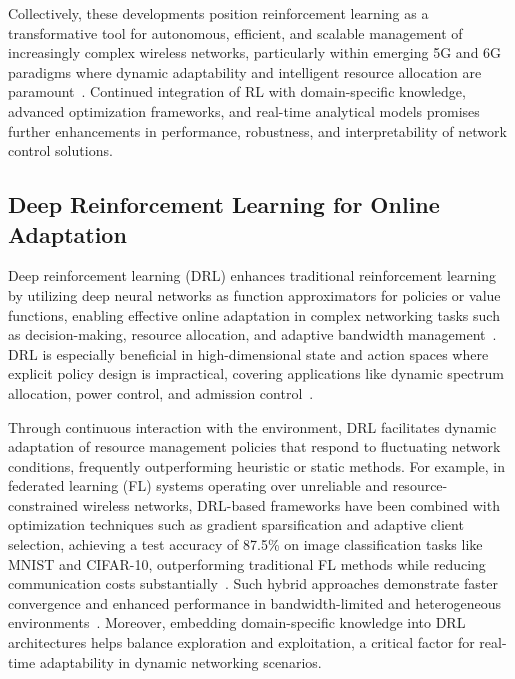 \documentclass[sigconf]{acmart}
\begin{document}
Collectively, these developments position reinforcement learning as a transformative tool for autonomous, efficient, and scalable management of increasingly complex wireless networks, particularly within emerging 5G and 6G paradigms where dynamic adaptability and intelligent resource allocation are paramount~\cite{ref7,ref50}. Continued integration of RL with domain-specific knowledge, advanced optimization frameworks, and real-time analytical models promises further enhancements in performance, robustness, and interpretability of network control solutions.

\subsection{Deep Reinforcement Learning for Online Adaptation}

Deep reinforcement learning (DRL) enhances traditional reinforcement learning by utilizing deep neural networks as function approximators for policies or value functions, enabling effective online adaptation in complex networking tasks such as decision-making, resource allocation, and adaptive bandwidth management~\cite{ref4,ref8,ref13,ref15,ref50}. DRL is especially beneficial in high-dimensional state and action spaces where explicit policy design is impractical, covering applications like dynamic spectrum allocation, power control, and admission control~\cite{ref4,ref8}.

Through continuous interaction with the environment, DRL facilitates dynamic adaptation of resource management policies that respond to fluctuating network conditions, frequently outperforming heuristic or static methods. For example, in federated learning (FL) systems operating over unreliable and resource-constrained wireless networks, DRL-based frameworks have been combined with optimization techniques such as gradient sparsification and adaptive client selection, achieving a test accuracy of 87.5\% on image classification tasks like MNIST and CIFAR-10, outperforming traditional FL methods while reducing communication costs substantially~\cite{ref4}. Such hybrid approaches demonstrate faster convergence and enhanced performance in bandwidth-limited and heterogeneous environments~\cite{ref50}. Moreover, embedding domain-specific knowledge into DRL architectures helps balance exploration and exploitation, a critical factor for real-time adaptability in dynamic networking scenarios.
\end{document}
